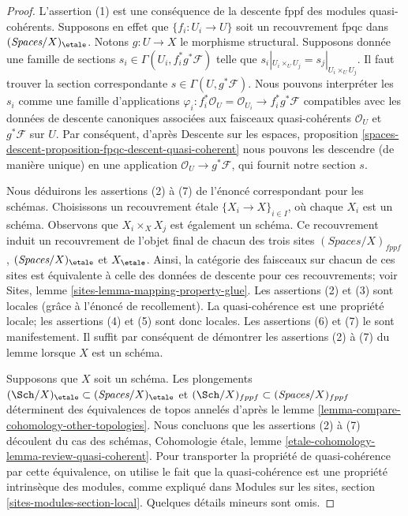\begin{proof}
L'assertion (1) est une conséquence de la descente fppf des modules
quasi-cohérents. Supposons en effet que $\{f_i : U_i \to U\}$ soit un
recouvrement fpqc dans $(\textit{Spaces}/X)_\etale$. Notons $g : U \to X$ le
morphisme structural. Supposons donnée une famille de sections
$s_i \in \Gamma(U_i , f_i^*g^*\mathcal{F})$ telle que
$s_i|_{U_i \times_U U_j} = s_j|_{U_i \times_U U_j}$. Il faut trouver la section
correspondante $s \in \Gamma(U, g^*\mathcal{F})$. Nous pouvons interpréter
les $s_i$ comme une famille d'applications
$\varphi_i : f_i^*\mathcal{O}_U = \mathcal{O}_{U_i} \to f_i^*g^*\mathcal{F}$
compatibles avec les données de descente canoniques associées aux faisceaux
quasi-cohérents $\mathcal{O}_U$ et $g^*\mathcal{F}$ sur $U$.
Par conséquent, d'après Descente sur les espaces, proposition
\ref{spaces-descent-proposition-fpqc-descent-quasi-coherent}
nous pouvons les descendre (de manière unique) en une application
$\mathcal{O}_U \to g^*\mathcal{F}$, qui fournit notre section $s$.

\medskip\noindent
Nous déduirons les assertions (2) à (7) de l'énoncé correspondant pour les
schémas. Choisissons un recouvrement étale $\{X_i \to X\}_{i \in I}$, où
chaque $X_i$ est un schéma. Observons que $X_i \times_X X_j$ est également un
schéma. Ce recouvrement induit un recouvrement de l'objet final de chacun des
trois sites
$(\textit{Spaces}/X)_{fppf}$, $(\textit{Spaces}/X)_\etale$ et $X_\etale$.
Ainsi, la catégorie des faisceaux sur chacun de ces sites est équivalente à
celle des données de descente pour ces recouvrements; voir Sites, lemme
\ref{sites-lemma-mapping-property-glue}. Les assertions (2) et (3) sont locales
(grâce à l'énoncé de recollement). La quasi-cohérence est une propriété locale;
les assertions (4) et (5) sont donc locales. Les assertions (6) et (7) le sont
manifestement. Il suffit par conséquent de démontrer les assertions (2) à (7)
du lemme lorsque $X$ est un schéma.

\medskip\noindent
Supposons que $X$ soit un schéma. Les plongements
$(\Sch/X)_\etale \subset (\textit{Spaces}/X)_\etale$ et
$(\Sch/X)_{fppf} \subset (\textit{Spaces}/X)_{fppf}$
déterminent des équivalences de topos annelés d'après le lemme
\ref{lemma-compare-cohomology-other-topologies}.
Nous concluons que les assertions (2) à (7) découlent du cas des schémas,
Cohomologie étale, lemme
\ref{etale-cohomology-lemma-review-quasi-coherent}.
Pour transporter la propriété de quasi-cohérence par cette équivalence, on
utilise le fait que la quasi-cohérence est une propriété intrinsèque des
modules, comme expliqué dans Modules sur les sites, section
\ref{sites-modules-section-local}. Quelques détails mineurs sont omis.
\end{proof}

